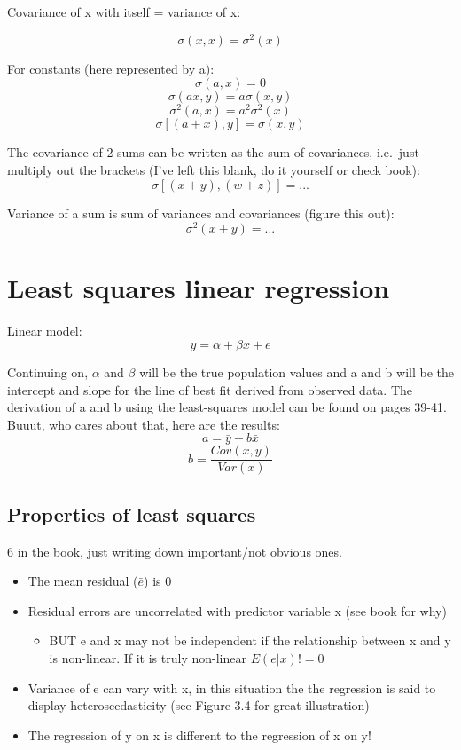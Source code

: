 \documentclass[
]{book}
\providecommand{\tightlist}{%
  \setlength{\itemsep}{0pt}\setlength{\parskip}{0pt}}
\begin{document}
Covariance of x with itself = variance of x:

\begin{equation}
    \sigma(x, x) = \sigma^2(x)
\end{equation}

For constants (here represented by a):
\[\sigma(a, x) = 0\]
\[\sigma(ax, y) = a\sigma(x, y)\]
\[\sigma^2(a, x) = a^2\sigma^2(x)\]
\[\sigma[(a + x), y] = \sigma(x, y)\]

The covariance of 2 sums can be written as the sum of covariances, i.e.~just multiply out the brackets (I've left this blank, do it yourself or check book):
\[\sigma[(x + y),(w + z)] = ...\]

Variance of a sum is sum of variances and covariances (figure this out):
\[\sigma^2(x + y) = ...\]

\hypertarget{least-squares-linear-regression}{%
\section{Least squares linear regression}\label{least-squares-linear-regression}}

Linear model:
\[y = \alpha + \beta{x} + e\]

Continuing on, \(\alpha\) and \(\beta\) will be the true population values and a and b will be the intercept and slope for the line of best fit derived from observed data. The derivation of a and b using the least-squares model can be found on pages 39-41. Buuut, who cares about that, here are the results:
\[a = \bar{y} - b\bar{x}\]
\[b = \frac{Cov(x, y)} {Var(x)}\]

\hypertarget{properties-of-least-squares}{%
\subsection{Properties of least squares}\label{properties-of-least-squares}}

6 in the book, just writing down important/not obvious ones.

\begin{itemize}
\tightlist
\item
  The mean residual (\(\bar{e}\)) is 0
\item
  Residual errors are uncorrelated with predictor variable x (see book for why)

  \begin{itemize}
  \tightlist
  \item
    BUT e and x may not be independent if the relationship between x and y is non-linear. If it is truly non-linear \(E(e|x) != 0\)
  \end{itemize}
\item
  Variance of e can vary with x, in this situation the the regression is said to display heteroscedasticity (see Figure 3.4 for great illustration)
\item
  The regression of y on x is different to the regression of x on y!
\end{itemize}
\end{document}
